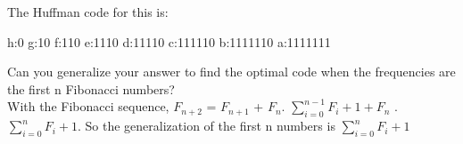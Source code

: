 \documentclass[12pt]{article}
\begin{document}
\begin{enumerate}
The Huffman code for this is:
\begin{algorithmic}
\STATE h:0
\STATE g:10
\STATE f:110
\STATE e:1110
\STATE d:11110
\STATE c:111110
\STATE b:1111110
\STATE a:1111111
\end{algorithmic}
Can you generalize your answer to find the optimal code when the frequencies are the first n Fibonacci numbers?\\
With the Fibonacci sequence, $F_{n+2}$ = $F_{n+1}$ + $F_n$. $\sum_{i=0}^{n-1} F_i + 1 + F_n$ . $\sum_{i=0}^n F_i + 1$. So the generalization of the first n numbers is $\sum_{i=0}^n F_i + 1$
\end{enumerate}

 
\end{document}
